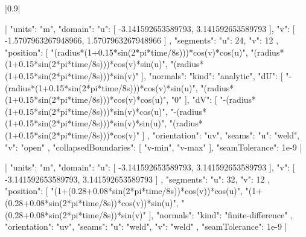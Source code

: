 \documentclass{article}
\begin{document}
\TLSetup{\usepackage{cmbright}}
|0.9|

|{
  "units": "m",
  "domain": {
    "u": [
      -3.141592653589793,
      3.141592653589793
    ],
    "v": [
      -1.5707963267948966,
      1.5707963267948966
    ]
  },
  "segments": {
    "u": 24,
    "v": 12
  },
  "position": [
    "(radius*(1+0.15*sin(2*pi*time/8s)))*cos(v)*cos(u)",
    "(radius*(1+0.15*sin(2*pi*time/8s)))*cos(v)*sin(u)",
    "(radius*(1+0.15*sin(2*pi*time/8s)))*sin(v)"
  ],
  "normals": {
    "kind": "analytic",
    "dU": [
      "-(radius*(1+0.15*sin(2*pi*time/8s)))*cos(v)*sin(u)",
      "(radius*(1+0.15*sin(2*pi*time/8s)))*cos(v)*cos(u)",
      "0"
    ],
    "dV": [
      "-(radius*(1+0.15*sin(2*pi*time/8s)))*sin(v)*cos(u)",
      "-(radius*(1+0.15*sin(2*pi*time/8s)))*sin(v)*sin(u)",
      "(radius*(1+0.15*sin(2*pi*time/8s)))*cos(v)"
    ]
  },
  "orientation": "uv",
  "seams": {
    "u": "weld",
    "v": "open"
  },
  "collapsedBoundaries": [
    "v-min",
    "v-max"
  ],
  "seamTolerance": 1e-9
}|

|{
  "units": "m",
  "domain": {
    "u": [
      -3.141592653589793,
      3.141592653589793
    ],
    "v": [
      -3.141592653589793,
      3.141592653589793
    ]
  },
  "segments": {
    "u": 32,
    "v": 12
  },
  "position": [
    "(1+(0.28+0.08*sin(2*pi*time/8s))*cos(v))*cos(u)",
    "(1+(0.28+0.08*sin(2*pi*time/8s))*cos(v))*sin(u)",
    "(0.28+0.08*sin(2*pi*time/8s))*sin(v)"
  ],
  "normals": {
    "kind": "finite-difference"
  },
  "orientation": "uv",
  "seams": {
    "u": "weld",
    "v": "weld"
  },
  "seamTolerance": 1e-9
}|
\end{document}

